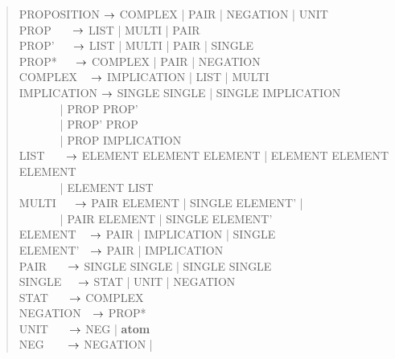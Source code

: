 \documentclass[a4]{article}
\begin{document}
\begin{quote}
\ttfamily
PROPOSITION $\rightarrow$ COMPLEX | PAIR | NEGATION | UNIT\\
PROP \(~~~~~~~\)$\rightarrow$ LIST | MULTI | PAIR\\
PROP' \(~~~~~~\)$\rightarrow$ LIST | MULTI | PAIR | SINGLE\\
PROP* \(~~~~~~\)$\rightarrow$ COMPLEX | PAIR | NEGATION\\
COMPLEX \(~~~~\)$\rightarrow$ IMPLICATION | LIST | MULTI\\
IMPLICATION $\rightarrow$ SINGLE  SINGLE
                    | SINGLE  IMPLICATION\\
\(~~~~~~~~~~~~~~~\) |
 PROP PROP'\\
\(~~~~~~~~~~~~~~~\) |
 PROP'  PROP\\
\(~~~~~~~~~~~~~~~\) |
 PROP  
IMPLICATION\\
LIST \(~~~~~~~\)$\rightarrow$ ELEMENT\txt{, } ELEMENT ELEMENT |
                      ELEMENT\txt{, } ELEMENT ELEMENT\\
\(~~~~~~~~~~~~~~~\) | ELEMENT\txt{, } LIST\\
MULTI \(~~~~~~\)$\rightarrow$ PAIR \: ELEMENT |
                      SINGLE  ELEMENT' |\\
\(~~~~~~~~~~~~~~~\) | PAIR  ELEMENT  |
                      SINGLE  ELEMENT'\\
ELEMENT \(~~~~\)$\rightarrow$ PAIR | IMPLICATION | SINGLE\\
ELEMENT' \(~~~\)$\rightarrow$ PAIR | IMPLICATION\\
PAIR \(~~~~~~~\)$\rightarrow$ SINGLE   SINGLE | SINGLE  SINGLE\\
SINGLE \(~~~~~\)$\rightarrow$ STAT | UNIT | NEGATION\\
STAT \(~~~~~~~\)$\rightarrow$ COMPLEX\\
NEGATION \(~~~\)$\rightarrow$ PROP*\\
UNIT \(~~~~~~~\)$\rightarrow$ NEG | {\bf atom}\\
NEG \(~~~~~~~~\)$\rightarrow$ NEGATION | \\
\end{quote}
\end{document}

